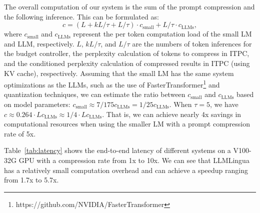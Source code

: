 The overall computation %
of our system is the sum of the %
prompt compression and the %
following inference. %
This can be formulated as:
\begin{equation}
    c = (L + kL/\tau + L/\tau) \cdot c_{\text{small}} + L/\tau \cdot c_{\text{LLMs}},
\end{equation}
where $c_{\text{small}}$ and $c_{\text{LLMs}}$ represent the per token computation load of the small LM and LLM, respectively.
$L$, $kL/\tau$, and $L/\tau$ 
are the numbers of token inferences for the budget controller, the perplexity calculation of tokens to compress in ITPC, and the conditioned perplexity calculation of compressed results in ITPC (using KV cache), respectively.
Assuming that the small LM has the same system optimizations as the LLMs, such as the use of FasterTransformer\footnote{https://github.com/NVIDIA/FasterTransformer} and quantization techniques, we can estimate the ratio between $c_{\text{small}}$ and $c_{\text{LLMs}}$ based on model parameters: %
$c_{\text{small}} \approx 7/175c_{\text{LLMs}} = 1/25c_{\text{LLMs}}$. When $\tau=5$, we have $c \approx 0.264 \cdot Lc_{\text{LLMs}} \approx 1/4 \cdot Lc_{\text{LLMs}}$.
That is, we can achieve nearly 4x savings in computational resources when using the smaller LM with a prompt compression rate of 5x.


Table~\ref{tab:latency} shows the end-to-end latency of different systems on a V100-32G GPU with a compression rate from 1x to 10x.
We can see that LLMLingua has a relatively small computation overhead and can achieve a speedup ranging from 1.7x to 5.7x.

 
